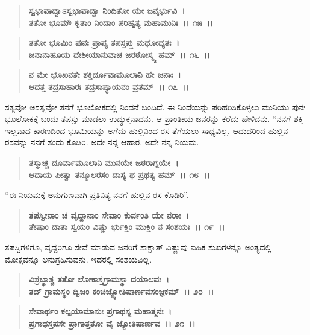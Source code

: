 \begin{verse}
\textbf{ಸ್ವಭಾವಾದ್ವಾಽಸ್ವಭಾವಾದ್ವಾ ನಿಂದಿತೋ ಯೇ ಜನೈರ್ಭುವಿ~।}\\\textbf{ತತೋ ಭೂಮೌ ಕೃತಾಂ ನಿಂದಾಂ ಪರಿಹೃತ್ಯ ಮಹಾಮುನಿಃ~।। ೧೫~।। }
\end{verse}

\begin{verse}
\textbf{ತತೋ ಭೂಮಿಂ ಪುನಃ ಪ್ರಾಪ್ಯ ತಪಸ್ತಪ್ತು ಮಥೋದ್ಯತಃ~।}\\\textbf{ಜನಾನಾಹೂಯ ದೇಶೀಯಾನುವಾಚ ಜರಠೋಸ್ಮ್ಯ ಹಮ್~।। ೧೬~।।} 
\end{verse}

\begin{verse}
\textbf{ನ ಮೇ ಭೂಖನತೇ ಶಕ್ತಿರ್ದೂವಾಮೂಲಾನಿ ಹೇ ಜನಾಃ~।}\\\textbf{ಆದತ್ತ ತದ್ರಸಾಹಾರಃ ತದ್ರಸಾಪ್ಯಾಯನಂ ವ್ರತಮ್~।। ೧೭~।।}
\end{verse}

ಸತ್ಯವೋ ಅಸತ್ಯವೋ ತನಗೆ ಭೂಲೋಕದಲ್ಲಿ ನಿಂದನೆ ಬಂದಿದೆ. ಈ ನಿಂದೆಯನ್ನು ಪರಿಹರಿಸಿಕೊಳ್ಳಲು ಮುನಿಯು ಪುನಃ ಭೂಲೋಕಕ್ಕೆ ಬಂದು ತಪಸ್ಸು ಮಾಡಲು ಉದ್ಯುಕ್ತನಾದನು. ಆ ಪ್ರಾಂತೀಯ ಜನರನ್ನು ಕರೆದು ಹೇಳಿದನು. “ನನಗೆ ಶಕ್ತಿ ಇಲ್ಲವಾದ ಕಾರಣದಿಂದ ಭೂಮಿಯನ್ನು ಅಗೆದು ಹುಲ್ಲಿನಿಂದ ರಸ ತೆಗೆಯಲು ಸಾಧ್ಯವಿಲ್ಲ. ಆದುದರಿಂದ ಹುಲ್ಲಿನ ರಸವನ್ನು ನನಗೆ ತಂದು ಕೊಡಿರಿ. ಅದೇ ನನ್ನ ಆಹಾರ. ಅದೇ ನನ್ನ ನಿಯಮ.

\begin{verse}
\textbf{ತಸ್ಮಾಚ್ಚ ದೂರ್ವಾಮೂಲಾನಿ ಮುನಯೇ ಜಠರಾಗ್ನಯೇ~।}\\\textbf{ಆದಾಯ ಪೀತ್ವಾ ತನ್ಮೂಲರಸಂ ದಾಸ್ಯ ಥ ಪ್ರಥತ್ಯ ಹಮ್~।। ೧೮~।। }
\end{verse}

“ಈ ನಿಯಮಕ್ಕೆ ಅನುಗುಣವಾಗಿ ಪ್ರತಿನಿತ್ಯ ನನಗೆ ಹುಲ್ಲಿನ ರಸ ಕೊಡಿರಿ”.

\begin{verse}
\textbf{ತಪಸ್ವೀನಾಂ ಚ ವೃದ್ದಾನಾಂ ಸೇವಾಂ ಕುರ್ವಂತಿ ಯೇ ನರಾಃ~।}\\\textbf{ತೇಷಾಂ ದಾತಾ ಸ್ವಯಂ ವಿಷ್ಣು ರ್ಭುಕ್ತಿಂ ಮುಕ್ತಿಂ ನ ಸಂಶಯಃ~।। ೧೯~।।}
\end{verse}

ತಪಸ್ವಿಗಳಿಗೂ, ವೃದ್ದರಿಗೂ ಸೇವೆ ಮಾಡುವ ಜನರಿಗೆ ಸಾಕ್ಷಾತ್ ವಿಷ್ಣುವು ಐಹಿಕ ಸುಖಗಳನ್ನೂ ಅಂತ್ಯದಲ್ಲಿ ಮೋಕ್ಷವನ್ನೂ ಅನುಗ್ರಹಿಸುವನು. ಇದರಲ್ಲಿ ಸಂಶಯವಿಲ್ಲ.

\begin{verse}
\textbf{ವಿಶ್ರಬ್ಧಾಶ್ಚ ತತೋ ಲೋಕಾಸ್ತಗ್ರಾಮಸ್ಥಾ ದಯಾಲವಃ~।}\\\textbf{ತದ್ ಗ್ರಾಮಸ್ಥಂ ದ್ವಿಜಂ ಕಂಚಿಜ್ಜ್ಯೋತಿಷಾರ್ಣವಸಂಜ್ಞಕಮ್~।। ೨೦~।। }
\end{verse}

\begin{verse}
\textbf{ಸೇವಾರ್ಥಂ ಕಲ್ಪಯಾಮಾಸುಃ ಪ್ರಗಾಥಸ್ಯ ಮಹಾತ್ಮನಃ~।}\\\textbf{ಪ್ರಗಾಥಸ್ತಪಸೇ ಪ್ರಾಗಾತ್ತತೋ ವೈ ಜ್ಯೋತಿಷಾರ್ಣವ~।। ೨೧~।।}
\end{verse}

